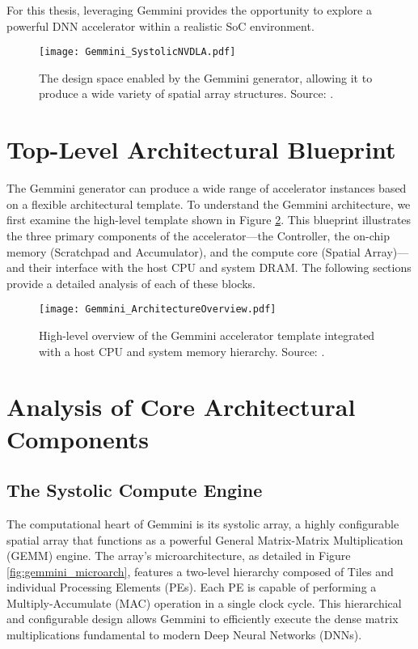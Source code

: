 For this thesis, leveraging Gemmini provides the opportunity to explore a powerful DNN accelerator within a realistic SoC environment.

\begin{figure}[h!]
    \centering
    \texttt{[image: Gemmini\_SystolicNVDLA.pdf]} 
    \caption[Architectural Flexibility of the Gemmini Generator]{The design space enabled by the Gemmini generator, allowing it to produce a wide variety of spatial array structures. Source: \cite{gemini-dac}.}
    \label{fig:gemmini_flexibility}
\end{figure}

\section{Top-Level Architectural Blueprint}
\label{sec:gemmini_blueprint}
The Gemmini generator can produce a wide range of accelerator instances based on a flexible architectural template. To understand the Gemmini architecture, we first examine the high-level template shown in Figure \ref{fig:gemmini_template}. This blueprint illustrates the three primary components of the accelerator---the Controller, the on-chip memory (Scratchpad and Accumulator), and the compute core (Spatial Array)---and their interface with the host CPU and system DRAM. The following sections provide a detailed analysis of each of these blocks.

\begin{figure}[htbp]
    \centering
    \texttt{[image: Gemmini\_ArchitectureOverview.pdf]}
    \caption{High-level overview of the Gemmini accelerator template integrated with a host CPU and system memory hierarchy. Source: \cite{gemini-dac}.}
    \label{fig:gemmini_template}
\end{figure}

\section{Analysis of Core Architectural Components}
\label{sec:gemmini_components}

\subsection{The Systolic Compute Engine}
The computational heart of Gemmini is its systolic array, a highly configurable spatial array that functions as a powerful General Matrix-Matrix Multiplication (GEMM) engine. The array's microarchitecture, as detailed in Figure \ref{fig:gemmini_microarch}, features a two-level hierarchy composed of Tiles and individual Processing Elements (PEs). Each PE is capable of performing a Multiply-Accumulate (MAC) operation in a single clock cycle. This hierarchical and configurable design allows Gemmini to efficiently execute the dense matrix multiplications fundamental to modern Deep Neural Networks (DNNs).


